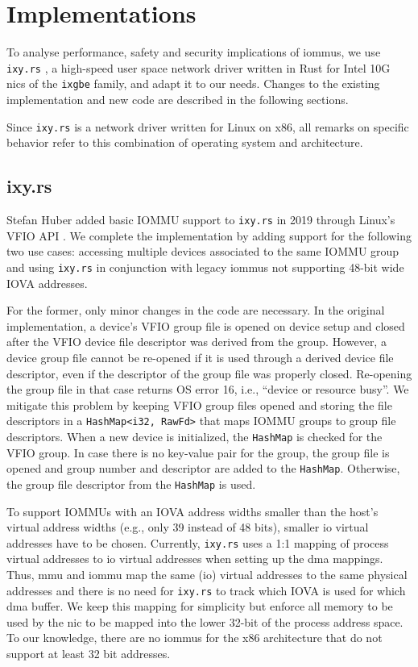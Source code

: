 \chapter{Implementations}
\label{chap:implementations}

To analyse performance, safety and security implications of \acp{iommu}, we use
\texttt{ixy.rs} \cite{ellmann2018writing}, a high-speed user space network
driver written in Rust for Intel 10G \acp{nic} of the \texttt{ixgbe} family, and
adapt it to our needs. Changes to the existing implementation and new code are
described in the following sections.

Since \texttt{ixy.rs} is a network driver written for Linux on x86, all remarks
on specific behavior refer to this combination of operating system and
architecture.


\section{ixy.rs}
\label{sec:ixy_rs}

Stefan Huber added basic IOMMU support to \texttt{ixy.rs} in 2019 through
Linux's VFIO API \cite{huber2019using}. We complete the implementation by adding
support for the following two use cases: accessing multiple devices associated
to the same IOMMU group and using \texttt{ixy.rs} in conjunction with legacy
\acp{iommu} not supporting 48-bit wide IOVA addresses.

For the former, only minor changes in the code are necessary. In the original
implementation, a device's VFIO group file is opened on device setup and closed
after the VFIO device file descriptor was derived from the group. However, a
device group file cannot be re-opened if it is used through a derived device
file descriptor, even if the descriptor of the group file was properly closed.
Re-opening the group file in that case returns OS error 16, i.e., ``device or
resource busy''. We mitigate this problem by keeping VFIO group files opened and
storing the file descriptors in a \texttt{HashMap<i32, RawFd>} that maps IOMMU
groups to group file descriptors. When a new device is initialized, the
\texttt{HashMap} is checked for the VFIO group. In case there is no key-value
pair for the group, the group file is opened and group number and descriptor are
added to the \texttt{HashMap}. Otherwise, the group file descriptor from the
\texttt{HashMap} is used.

To support IOMMUs with an IOVA address widths smaller than the host's virtual
address widths (e.g., only 39 instead of 48 bits), smaller \ac{io} virtual
addresses have to be chosen. Currently, \texttt{ixy.rs} uses a 1:1 mapping of
process virtual addresses to \ac{io} virtual addresses when setting up the
\ac{dma} mappings. Thus, \ac{mmu} and \ac{iommu} map the same (\ac{io}) virtual
addresses to the same physical addresses and there is no need for
\texttt{ixy.rs} to track which IOVA is used for which \ac{dma} buffer. We keep
this mapping for simplicity but enforce all memory to be used by the \ac{nic} to
be mapped into the lower 32-bit of the process address space. To our knowledge,
there are no \acp{iommu} for the x86 architecture that do not support at least
32 bit addresses.

